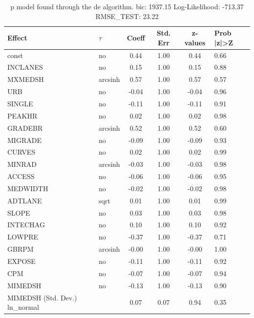 \begin{table}
	\caption{p model found through the de algorithm. bic: 1937.15 Log-Likelihood: -713.37 RMSE_TEST: 23.22}
	\begin{center}
		\begin{tabular}{|l|l|c|c|c|l|}
			\hline
			Effect & $\tau$ & Coeff & Std. Err & z-values & Prob |z|>Z \\
			\hline
			const & no & 0.44 & 1.00 & 0.44 & 0.66 \\
			\hline
			INCLANES & no & 0.15 & 1.00 & 0.15 & 0.88 \\
			\hline
			MXMEDSH & arcsinh & 0.57 & 1.00 & 0.57 & 0.57 \\
			\hline
			URB & no & -0.04 & 1.00 & -0.04 & 0.96 \\
			\hline
			SINGLE & no & -0.11 & 1.00 & -0.11 & 0.91 \\
			\hline
			PEAKHR & no & 0.02 & 1.00 & 0.02 & 0.98 \\
			\hline
			GRADEBR & arcsinh & 0.52 & 1.00 & 0.52 & 0.60 \\
			\hline
			MIGRADE & no & -0.09 & 1.00 & -0.09 & 0.93 \\
			\hline
			CURVES & no & 0.02 & 1.00 & 0.02 & 0.99 \\
			\hline
			MINRAD & arcsinh & -0.03 & 1.00 & -0.03 & 0.98 \\
			\hline
			ACCESS & no & -0.06 & 1.00 & -0.06 & 0.95 \\
			\hline
			MEDWIDTH & no & -0.02 & 1.00 & -0.02 & 0.98 \\
			\hline
			ADTLANE & sqrt & 0.01 & 1.00 & 0.01 & 0.99 \\
			\hline
			SLOPE & no & 0.03 & 1.00 & 0.03 & 0.98 \\
			\hline
			INTECHAG & no & 0.10 & 1.00 & 0.10 & 0.92 \\
			\hline
			LOWPRE & no & -0.37 & 1.00 & -0.37 & 0.71 \\
			\hline
			GBRPM & arcsinh & -0.00 & 1.00 & -0.00 & 1.00 \\
			\hline
			EXPOSE & no & -0.11 & 1.00 & -0.11 & 0.92 \\
			\hline
			CPM & no & -0.07 & 1.00 & -0.07 & 0.94 \\
			\hline
			MIMEDSH & no & -0.13 & 1.00 & -0.13 & 0.90 \\
			\hline
			MIMEDSH (Std. Dev.) ln_normal &  & 0.07 & 0.07 & 0.94 & 0.35 \\
			\hline
		\end{tabular}
	\end{center}
\end{table}